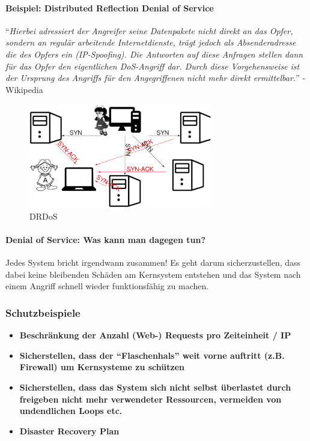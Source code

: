 \documentclass[10pt,a4paper]{article}
\begin{document}
\paragraph*{Beispiel: Distributed Reflection Denial of Service}
\noindent
"`\textsl{Hierbei adressiert der Angreifer seine Datenpakete nicht direkt an das Opfer, sondern an regulär arbeitende Internetdienste, trägt jedoch als Absenderadresse die des Opfers ein (IP-Spoofing). Die Antworten auf diese Anfragen stellen dann für das Opfer den eigentlichen DoS-Angriff dar. Durch diese Vorgehensweise ist der Ursprung des Angriffs für den Angegriffenen nicht mehr direkt ermittelbar.}"' - Wikipedia

\begin{figure}[H]
    \begin{center}
    \includegraphics[width=8cm]{images/DRDoS.png}
    \caption{DRDoS}
    \label{DRDoS}
    \end{center}
\end{figure}

\paragraph*{Denial of Service: Was kann man dagegen tun?} Jedes System bricht irgendwann zusammen! Es geht darum sicherzustellen, dass dabei keine bleibenden Schäden am
Kernsystem entstehen und das System nach einem Angriff schnell wieder funktionsfähig zu machen.

\subsubsection*{Schutzbeispiele}
\begin{itemize}[noitemsep,topsep=0pt,leftmargin=*]
    \item \textbf{Beschränkung der Anzahl (Web-) Requests pro Zeiteinheit / IP }
    \item \textbf{Sicherstellen, dass der "`Flaschenhals"' weit vorne auftritt (z.B. Firewall) um Kernsysteme zu schützen}
    \item \textbf{Sicherstellen, dass das System sich nicht selbst überlastet durch freigeben nicht mehr verwendeter Ressourcen, vermeiden von undendlichen Loops etc.}
    \item \textbf{Disaster Recovery Plan}
\end{itemize}
\end{document}
